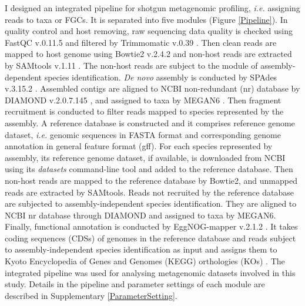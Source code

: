 \documentclass[11pt]{article}
\begin{document}
      I designed an integrated pipeline for shotgun metagenomic profiling, \textit{i.e.} assigning reads to taxa or FGCs. 
      It is separated into five modules (Figure \ref{Pipeline}).
      \newline
      In quality control and host removing, raw sequencing data quality is checked using FastQC v.0.11.5 \citep{andrews2010fastqc} and filtered by Trimmomatic v.0.39 \citep{bolger2014trimmomatic}. 
      Then clean reads are mapped to host genome using Bowtie2 v.2.4.2 \citep{langmead2012fast} and non-host reads are extracted by SAMtools v.1.11 \citep{li2009sequence}. 
      \newline
      The non-host reads are subject to the module of assembly-dependent species identification. 
      \textit{De novo} assembly is conducted by SPAdes v.3.15.2 \citep{prjibelski2020using}. 
      Assembled contigs are aligned to NCBI non-redundant (nr) database by DIAMOND v.2.0.7.145 \citep{buchfink2015fast}, and assigned to taxa by MEGAN6 \citep{huson2007megan}. 
      \newline
      Then fragment recruitment is conducted to filter reads mapped to species represented by the assembly. 
      A reference database is constructed and it comprises reference genome dataset, \textit{i.e.} genomic sequences in FASTA format and corresponding genome annotation in general feature format (gff). 
      For each species represented by assembly, its reference genome dataset, if available, is downloaded from NCBI using its \textit{datasets} command-line tool and added to the reference database. 
      Then non-host reads are mapped to the reference database by Bowtie2, and unmapped reads are extracted by SAMtools. 
      \newline
      Reads not recruited by the reference database are subjected to assembly-independent species identification. 
      They are aligned to NCBI nr database through DIAMOND and assigned to taxa by MEGAN6.
      \newline
      Finally, functional annotation is conducted by EggNOG-mapper v.2.1.2 \citep{huerta2017fast}. 
      It takes coding sequences (CDSs) of genomes in the reference database and reads subject to assembly-independent species identification as input and assigns them to Kyoto Encyclopedia of Genes and Genomes (KEGG) orthologies (KOs) \citep{kanehisa2000kegg}.
      \newline
      The integrated pipeline was used for analysing metagenomic datasets involved in this study. 
      Details in the pipeline and parameter settings of each module are described in Supplementary \ref{ParameterSetting}.
      
\end{document}
